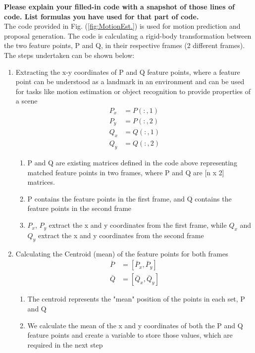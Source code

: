 \textbf{Please explain your filled-in code with a snapshot of those lines of code. List formulas you have used for that part of code.}\\
The code provided in Fig. (\ref{fig:MotionEst.}) is used for motion prediction and proposal generation. The code is calculating a rigid-body transformation between the two feature points, P and Q, in their respective frames (2 different frames). The steps undertaken can be shown below:
\begin{enumerate}
    \item Extracting the x-y coordinates of P and Q feature points, where a feature point can be understood as a landmark in an environment and can be used for tasks like motion estimation or object recognition to provide properties of a scene
    \begin{align*}
        P_x &= P(:,1) \\
        P_y &= P(:,2) \\
        Q_x &= Q(:,1) \\
        Q_y &= Q(:,2)
    \end{align*}
    \begin{enumerate}
        \item P and Q are existing matrices defined in the code above representing matched feature points in two frames, where P and Q are [n x 2] matrices.  
        \item P contains the feature points in the first frame, and Q contains the feature points in the second frame
        \item $P_x$, $P_y$ extract the x and y coordinates from the first frame, while $Q_x$ and $Q_y$ extract the x and y coordinates from the second frame
    \end{enumerate}
    \item Calculating the Centroid (mean) of the feature points for both frames
    \begin{align}
        \bar{P} &= \left[ \bar{P}_x, \bar{P}_y \right] \\
        \bar{Q} &= \left[ \bar{Q}_x, \bar{Q}_y \right]
    \end{align}
    \begin{enumerate}
        \item The centroid represents the "mean" position of the points in each set, P and Q
        \item We calculate the mean of the x and y coordinates of both the P and Q feature points and create a variable to store those values, which are required in the next step

\end{enumerate}
\end{enumerate}
